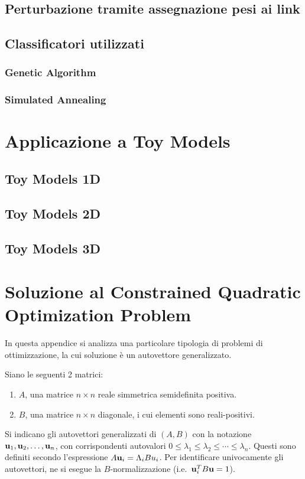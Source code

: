 \documentclass[10pt,a4paper]{article}
\begin{document}
\subsection{Perturbazione tramite assegnazione pesi ai link}

\subsection{Classificatori utilizzati}

\subsubsection{Genetic Algorithm}

\subsubsection{Simulated Annealing}

\section{Applicazione a Toy Models}\label{sec:applicazione}

\subsection{Toy Models 1D}

\subsection{Toy Models 2D}

\subsection{Toy Models 3D}

\appendix
\section{Soluzione al Constrained Quadratic Optimization Problem}\label{sec:soluzione_constrained}
In questa appendice si analizza una particolare tipologia di problemi di ottimizzazione, la cui soluzione è un autovettore generalizzato.

Siano le seguenti 2 matrici:
\begin{enumerate}
    \item \(A\), una matrice \(n \times n\) reale simmetrica semidefinita positiva.
    \item \(B\), una matrice \(n \times n\) diagonale, i cui elementi sono reali-positivi.
\end{enumerate}
Si indicano gli autovettori generalizzati di \((A,B)\) con la notazione \(\vb{u}_1,\vb{u}_2,\ldots,\vb{u}_n\), con corrispondenti autovalori \(0\leq\lambda_1\leq\lambda_2\leq\cdots\leq\lambda_n\).
Questi sono definiti secondo l'espressione \(A \vb{u}_i = \Lambda_i B u_i\).
Per identificare univocamente gli autovettori, ne si esegue la \(B\)-normalizzazione (i.e.\  \(\vb{u}_i^T B \vb{u}=1\)).
\end{document}
